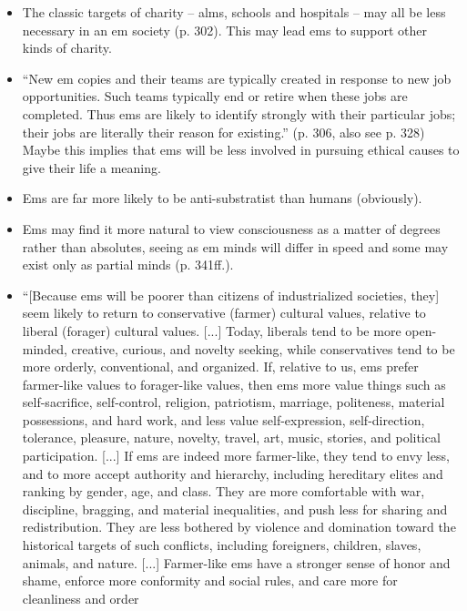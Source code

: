 \documentclass[]{article}
\begin{document}
\begin{itemize}
{  2000, ch. 4.IV, section ``Ecosystems are Inherently Valuable?'')}, we
  should expect ems to care significantly less about preserving nature.
\item
  The classic targets of charity -- alms, schools and hospitals -- may
  all be less necessary in an em society (p. 302). This may lead ems to
  support other kinds of charity.
\item
  ``New em copies and their teams are typically created in response to
  new job opportunities. Such teams typically end or retire when these
  jobs are completed. Thus ems are likely to identify strongly with
  their particular jobs; their jobs are literally their reason for
  existing.'' (p. 306, also see p. 328) Maybe this implies that ems will
  be less involved in pursuing ethical causes to give their life a
  meaning.
\item
  Ems are far more likely to be anti-substratist than humans
  (obviously).
\item
  Ems may find it more natural to view consciousness as a matter of
  degrees rather than absolutes, seeing as em minds will differ in speed
  and some may exist only as partial minds (p. 341ff.).
\item
  ``{[}Because ems will be poorer than citizens of industrialized
  societies, they{]} seem likely to return to conservative (farmer)
  cultural values, relative to liberal (forager) cultural values.
  {[}...{]} Today, liberals tend to be more open-minded, creative,
  curious, and novelty seeking, while conservatives tend to be more
  orderly, conventional, and organized. If, relative to us, ems prefer
  farmer-like values to forager-like values, then ems more value things
  such as self-sacrifice, self-control, religion, patriotism, marriage,
  politeness, material possessions, and hard work, and less value
  self-expression, self-direction, tolerance, pleasure, nature, novelty,
  travel, art, music, stories, and political participation. {[}...{]} If
  ems are indeed more farmer-like, they tend to envy less, and to more
  accept authority and hierarchy, including hereditary elites and
  ranking by gender, age, and class. They are more comfortable with war,
  discipline, bragging, and material inequalities, and push less for
  sharing and redistribution. They are less bothered by violence and
  domination toward the historical targets of such conflicts, including
  foreigners, children, slaves, animals, and nature. {[}...{]}
  Farmer-like ems have a stronger sense of honor and shame, enforce more
  conformity and social rules, and care more for cleanliness and order

\end{itemize}
\end{document}

